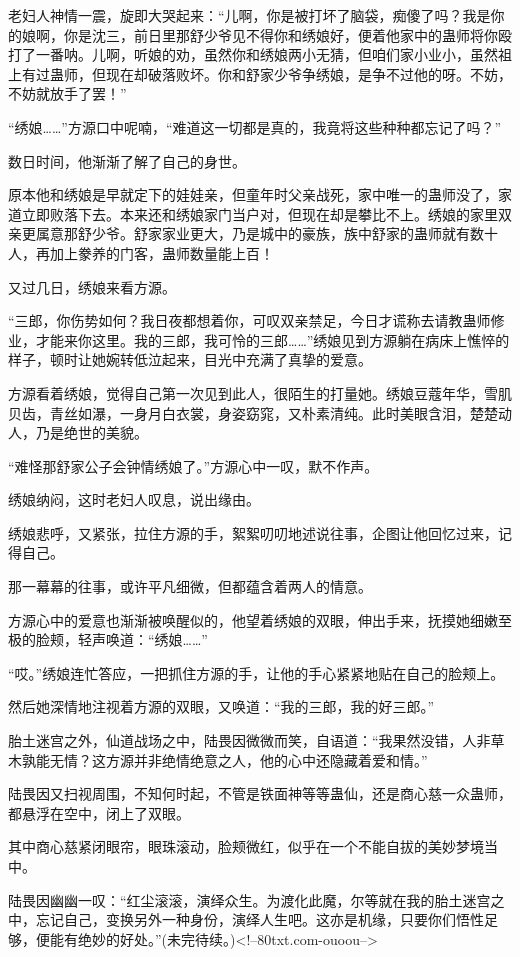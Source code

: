 \begin{this_body}
老妇人神情一震，旋即大哭起来：“儿啊，你是被打坏了脑袋，痴傻了吗？我是你的娘啊，你是沈三，前日里那舒少爷见不得你和绣娘好，便着他家中的蛊师将你殴打了一番呐。儿啊，听娘的劝，虽然你和绣娘两小无猜，但咱们家小业小，虽然祖上有过蛊师，但现在却破落败坏。你和舒家少爷争绣娘，是争不过他的呀。不妨，不妨就放手了罢！”

“绣娘……”方源口中呢喃，“难道这一切都是真的，我竟将这些种种都忘记了吗？”

数日时间，他渐渐了解了自己的身世。

原本他和绣娘是早就定下的娃娃亲，但童年时父亲战死，家中唯一的蛊师没了，家道立即败落下去。本来还和绣娘家门当户对，但现在却是攀比不上。绣娘的家里双亲更属意那舒少爷。舒家家业更大，乃是城中的豪族，族中舒家的蛊师就有数十人，再加上豢养的门客，蛊师数量能上百！

又过几日，绣娘来看方源。

“三郎，你伤势如何？我日夜都想着你，可叹双亲禁足，今日才谎称去请教蛊师修业，才能来你这里。我的三郎，我可怜的三郎……”绣娘见到方源躺在病床上憔悴的样子，顿时让她婉转低泣起来，目光中充满了真挚的爱意。

方源看着绣娘，觉得自己第一次见到此人，很陌生的打量她。绣娘豆蔻年华，雪肌贝齿，青丝如瀑，一身月白衣裳，身姿窈窕，又朴素清纯。此时美眼含泪，楚楚动人，乃是绝世的美貌。

“难怪那舒家公子会钟情绣娘了。”方源心中一叹，默不作声。

绣娘纳闷，这时老妇人叹息，说出缘由。

绣娘悲呼，又紧张，拉住方源的手，絮絮叨叨地述说往事，企图让他回忆过来，记得自己。

那一幕幕的往事，或许平凡细微，但都蕴含着两人的情意。

方源心中的爱意也渐渐被唤醒似的，他望着绣娘的双眼，伸出手来，抚摸她细嫩至极的脸颊，轻声唤道：“绣娘……”

“哎。”绣娘连忙答应，一把抓住方源的手，让他的手心紧紧地贴在自己的脸颊上。

然后她深情地注视着方源的双眼，又唤道：“我的三郎，我的好三郎。”

胎土迷宫之外，仙道战场之中，陆畏因微微而笑，自语道：“我果然没错，人非草木孰能无情？这方源并非绝情绝意之人，他的心中还隐藏着爱和情。”

陆畏因又扫视周围，不知何时起，不管是铁面神等等蛊仙，还是商心慈一众蛊师，都悬浮在空中，闭上了双眼。

其中商心慈紧闭眼帘，眼珠滚动，脸颊微红，似乎在一个不能自拔的美妙梦境当中。

陆畏因幽幽一叹：“红尘滚滚，演绎众生。为渡化此魔，尔等就在我的胎土迷宫之中，忘记自己，变换另外一种身份，演绎人生吧。这亦是机缘，只要你们悟性足够，便能有绝妙的好处。”(未完待续。)<!--80txt.com-ouoou-->

\end{this_body}

